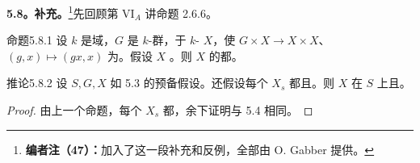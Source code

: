 \textbf{5.8。补充。}\footnote{\textbf{编者注（47）：}加入了这一段补充和反例，全部由 O. Gabber 提供。}先回顾第 VI$_A$ 讲命题 2.6.6。
\begin{SGAresult}{命题}{5.8.1}
设 $k$ 是域，$G$ 是 $k$-群，于 $k$- $X$，使 $G\times X\to X\times X$、$(g,x)\mapsto(gx,x)$ 为。假设 $X$ 。则 $X$ 的都。
\end{SGAresult}
\begin{SGAresult}{推论}{5.8.2}
设 $S,G,X$ 如 5.3 的预备假设。还假设每个 $X_s$ 都且。则 $X$ 在 $S$ 上且。
\end{SGAresult}
\begin{proof}
由上一个命题，每个 $X_s$ 都，余下证明与 5.4 相同。
\end{proof}
